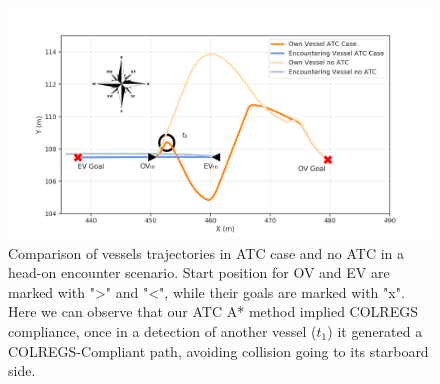         \begin{figure}[H]
            \centering
            \includegraphics[width=\textwidth]{figs/Chap5/plot_ho_w_vs_wo.png}
            \caption{Comparison of vessels trajectories in \ac{ATC} case and no \ac{ATC} in a head-on encounter scenario. Start position for \ac{OV} and \ac{EV} are marked with ">" and "<", while their goals are marked with "x". Here we can observe that our \ac{ATC} A* method implied COLREGS compliance, once in a detection of another vessel ($t_1$) it generated a COLREGS-Compliant path, avoiding collision going to its starboard side.}
            \label{fig:plot_ho_w_vs_wo}
        \end{figure}
        
